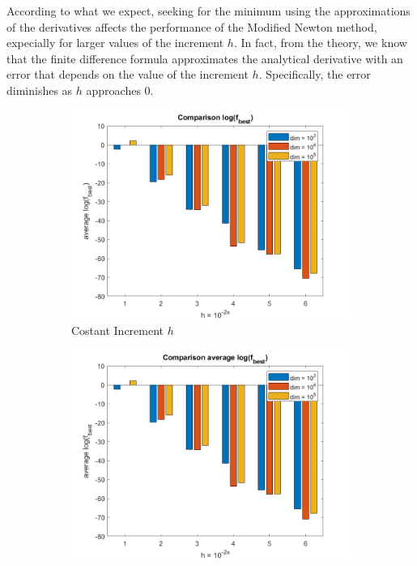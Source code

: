 According to what we expect, seeking for the minimum using the approximations of the derivatives affects the performance of the Modified Newton method, expecially for larger values of the increment $h$. 
In fact, from the theory, we know that the finite difference formula approximates the analytical derivative with an error that depends on the value of the increment $h$. Specifically, the error diminishes as $h$ approaches $0$.

\begin{figure}[htbp]
    \centering
    \begin{subfigure}[t]{0.45\textwidth}  %
        \centering
        \includegraphics[width=\textwidth]{img/pb25_MN_difffinite_COST_log(fbest).png}
        \caption{Costant Increment $h$}
    \end{subfigure}
    \hspace{1cm} %
    \begin{subfigure}[t]{0.45\textwidth}
        \centering
        \includegraphics[width=\textwidth]{img/pb25_MN_difffinite_REL_log(fbest).png}

\end{subfigure}
\end{figure}
